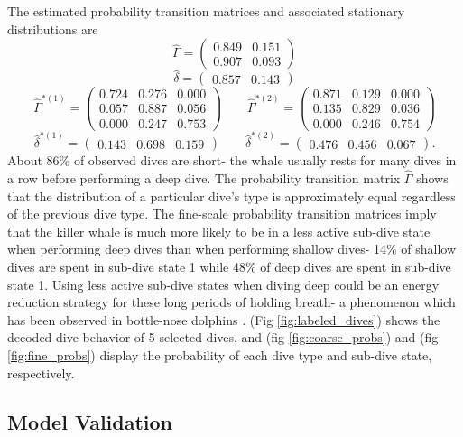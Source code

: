 The estimated probability transition matrices and associated stationary distributions are
%
$$\hat \Gamma = \begin{pmatrix} 
0.849 & 0.151 \\
0.907 & 0.093
\end{pmatrix}$$
$$\hat \delta = \begin{pmatrix} 0.857 & 0.143 \end{pmatrix}$$
%
$$\hat \Gamma^{*(1)} = \begin{pmatrix} 
0.724 & 0.276 & 0.000 \\
0.057 & 0.887 & 0.056 \\
0.000 & 0.247 & 0.753
\end{pmatrix} \qquad 
\hat \Gamma^{*(2)} = \begin{pmatrix} 
0.871 & 0.129 & 0.000 \\
0.135 & 0.829 & 0.036 \\
0.000 & 0.246 & 0.754
\end{pmatrix}$$
$$\hat \delta^{*(1)} = \begin{pmatrix} 0.143 & 0.698 & 0.159 \end{pmatrix} \qquad
\hat \delta^{*(2)} = \begin{pmatrix} 0.476 & 0.456 & 0.067 \end{pmatrix}.$$
%
About 86\% of observed dives are short- the whale usually rests for many dives in a row before performing a deep dive. The probability transition matrix $\hat \Gamma$ shows that the distribution of a particular dive's type is approximately equal regardless of the previous dive type. The fine-scale probability transition matrices imply that the killer whale is much more likely to be in a less active sub-dive state when performing deep dives than when performing shallow dives- 14\% of shallow dives are spent in sub-dive state 1 while 48\% of deep dives are spent in sub-dive state 1. Using less active sub-dive states when diving deep could be an energy reduction strategy for these long periods of holding breath- a phenomenon which has been observed in bottle-nose dolphins \citep{Williams:1999}. (Fig \ref{fig:labeled_dives}) shows the decoded dive behavior of 5 selected dives, and (fig \ref{fig:coarse_probs}) and (fig \ref{fig:fine_probs}) display the probability of each dive type and sub-dive state, respectively.

\subsection{Model Validation}
\label{subsec:model_validation}

